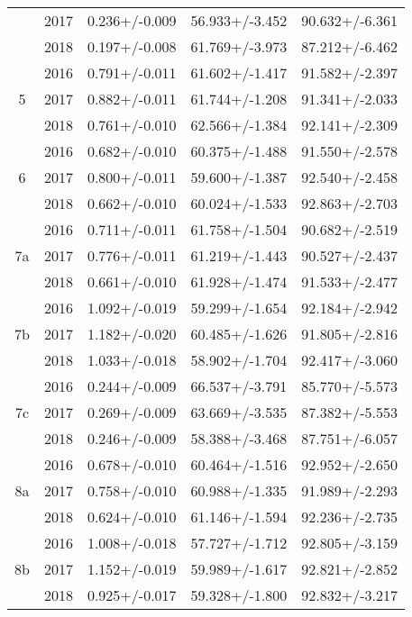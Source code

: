 \begin{table}
\begin{tabular}{ccccc}
   & 2017 &          0.236+/-0.009 &       56.933+/-3.452 &        90.632+/-6.361 \\
   & 2018 &          0.197+/-0.008 &       61.769+/-3.973 &        87.212+/-6.462 \\
\cline{1-5}
\multirow{3}{*}{5} & 2016 &          0.791+/-0.011 &       61.602+/-1.417 &        91.582+/-2.397 \\
   & 2017 &          0.882+/-0.011 &       61.744+/-1.208 &        91.341+/-2.033 \\
   & 2018 &          0.761+/-0.010 &       62.566+/-1.384 &        92.141+/-2.309 \\
\cline{1-5}
\multirow{3}{*}{6} & 2016 &          0.682+/-0.010 &       60.375+/-1.488 &        91.550+/-2.578 \\
   & 2017 &          0.800+/-0.011 &       59.600+/-1.387 &        92.540+/-2.458 \\
   & 2018 &          0.662+/-0.010 &       60.024+/-1.533 &        92.863+/-2.703 \\
\cline{1-5}
\multirow{3}{*}{7a} & 2016 &          0.711+/-0.011 &       61.758+/-1.504 &        90.682+/-2.519 \\
   & 2017 &          0.776+/-0.011 &       61.219+/-1.443 &        90.527+/-2.437 \\
   & 2018 &          0.661+/-0.010 &       61.928+/-1.474 &        91.533+/-2.477 \\
\cline{1-5}
\multirow{3}{*}{7b} & 2016 &          1.092+/-0.019 &       59.299+/-1.654 &        92.184+/-2.942 \\
   & 2017 &          1.182+/-0.020 &       60.485+/-1.626 &        91.805+/-2.816 \\
   & 2018 &          1.033+/-0.018 &       58.902+/-1.704 &        92.417+/-3.060 \\
\cline{1-5}
\multirow{3}{*}{7c} & 2016 &          0.244+/-0.009 &       66.537+/-3.791 &        85.770+/-5.573 \\
   & 2017 &          0.269+/-0.009 &       63.669+/-3.535 &        87.382+/-5.553 \\
   & 2018 &          0.246+/-0.009 &       58.388+/-3.468 &        87.751+/-6.057 \\
\cline{1-5}
\multirow{3}{*}{8a} & 2016 &          0.678+/-0.010 &       60.464+/-1.516 &        92.952+/-2.650 \\
   & 2017 &          0.758+/-0.010 &       60.988+/-1.335 &        91.989+/-2.293 \\
   & 2018 &          0.624+/-0.010 &       61.146+/-1.594 &        92.236+/-2.735 \\
\cline{1-5}
\multirow{3}{*}{8b} & 2016 &          1.008+/-0.018 &       57.727+/-1.712 &        92.805+/-3.159 \\
   & 2017 &          1.152+/-0.019 &       59.989+/-1.617 &        92.821+/-2.852 \\
   & 2018 &          0.925+/-0.017 &       59.328+/-1.800 &        92.832+/-3.217 \\
\bottomrule
\end{tabular}
\end{table}
